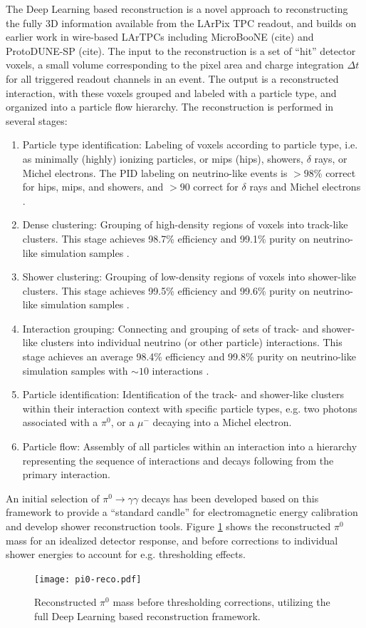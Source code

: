 The Deep Learning based reconstruction is a novel approach to reconstructing the fully 3D information available from the LArPix TPC readout, and builds on earlier work in wire-based LArTPCs including MicroBooNE (cite) and ProtoDUNE-SP (cite). The input to the reconstruction is a set of ``hit'' detector voxels, a small volume corresponding to the pixel area and charge integration $\Delta t$ for all triggered readout channels in an event. The output is a reconstructed interaction, with these voxels grouped and labeled with a particle type, and organized into a particle flow hierarchy. The reconstruction is performed in several stages:
\begin{enumerate}
\item Particle type identification: Labeling of voxels according to particle type, i.e. as minimally (highly) ionizing particles, or mips (hips), showers, $\delta$ rays, or Michel electrons. The PID labeling on neutrino-like events is $>98$\% correct for hips, mips, and showers, and $>90$ correct for $\delta$ rays and Michel electrons \cite{domine2020point}.
\item Dense clustering: Grouping of high-density regions of voxels into track-like clusters. This stage achieves 98.7\% efficiency and 99.1\% purity on neutrino-like simulation samples \cite{koh2020scalable}.
\item Shower clustering: Grouping of low-density regions of voxels into shower-like clusters. This stage achieves 99.5\% efficiency and 99.6\% purity on neutrino-like simulation samples \cite{koh2020scalable}.
\item Interaction grouping: Connecting and grouping of sets of track- and shower-like clusters into individual neutrino (or other particle) interactions. This stage achieves an average 98.4\% efficiency and 99.8\% purity on neutrino-like simulation samples with $\sim10$ interactions \cite{koh2020scalable}.
\item Particle identification: Identification of the track- and shower-like clusters within their interaction context with specific particle types, e.g. two photons associated with a $\pi^0$, or a $\mu^-$ decaying into a Michel electron.
\item Particle flow: Assembly of all particles within an interaction into a hierarchy representing the sequence of interactions and decays following from the primary interaction.
\end{enumerate}
An initial selection of $\pi^0\to\gamma\gamma$ decays has been developed based on this framework to provide a ``standard candle'' for electromagnetic energy calibration and develop shower reconstruction tools. Figure \ref{fig:ndlar-ana-pi0-reco} shows the reconstructed $\pi^0$ mass for an idealized detector response, and before corrections to individual shower energies to account for e.g. thresholding effects.
\begin{figure}
\centering
\texttt{[image: pi0-reco.pdf]}
\caption{Reconstructed $\pi^0$ mass before thresholding corrections, utilizing the full Deep Learning based reconstruction framework.}
\label{fig:ndlar-ana-pi0-reco}
\end{figure}

